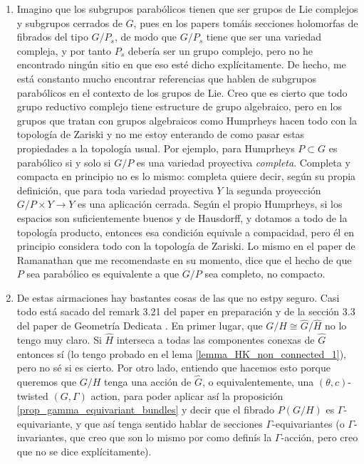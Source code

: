 {\begin{enumerate}
    \item[\textbf{(14)}] Imagino que los subgrupos parabólicos tienen que ser grupos de Lie complejos y subgrupos cerrados de \(G\), pues en los papers tomáis secciones holomorfas de fibrados del tipo \(G/P_s\), de modo que \(G/P_s\) tiene que ser una variedad compleja, y por tanto \(P_s\) debería ser un grupo complejo, pero no he encontrado ningún sitio en que eso esté dicho explícitamente. De hecho, me está constanto mucho encontrar referencias que hablen de subgrupos parabólicos en el contexto de los grupos de Lie. Creo que es cierto que todo grupo reductivo complejo tiene estructure de grupo algebraico, pero en los grupos que tratan con grupos algebraicos como Humprheys \parencite{humphreys1975linear} hacen todo con la topología de Zariski y no me estoy enterando de como pasar estas propiedades a la topología usual. Por ejemplo, para Humprheys \(P \subset G\) es parabólico si y solo si \(G/P\) es una variedad proyectiva \textit{completa}. Completa y compacta en principio no es lo mismo: completa quiere decir, según su propia definición, que para toda variedad proyectiva \(Y\) la segunda proyección \(G/P \times Y \to Y\) es una aplicación cerrada. Según el propio Humprheys, si los espacios son suficientemente buenos y de Hausdorff, y dotamos a todo de la topología producto, entonces esa condición equivale a compacidad, pero él en principio considera todo con la topología de Zariski. Lo mismo en el paper de Ramanathan \parencite{Ramanathan1996} que me recomendaste en su momento, dice que el hecho de que \(P\) sea parabólico es equivalente a que \(G/P\) sea completo, no compacto.
    \item[\textbf{(15)}] De estas airmaciones hay bastantes cosas de las que no estpy seguro. Casi todo está sacado del remark 3.21 del paper en preparación y de la sección 3.3 del paper de Geometría Dedicata \parencite{barajas2023non}. En primer lugar, que \(G/H\cong \hat{G}/\hat{H}\) no lo tengo muy claro. Si \(\hat{H}\) interseca a todas las componentes conexas de \(\hat{G}\) entonces sí (lo tengo probado en el lema \ref{lemma_HK_non_connected_1}), pero no sé si es cierto. Por otro lado, entiendo que hacemos esto porque queremos que \(G/H\) tenga una acción de \(\hat{G}\), o equivalentemente, una \((\theta,c)\)-twisted \((G, \Gamma)\) action, para poder aplicar así la proposición \ref{prop_gamma_equivariant_bundles} y decir que el fibrado \(P(G/H)\) es \(\Gamma\)-equivariante, y que así tenga sentido hablar de secciones \(\Gamma\)-equivariantes (o \(\Gamma\)-invariantes, que creo que son lo mismo por como definís la \(\Gamma\)-acción, pero creo que no se dice explícitamente).

\end{enumerate}}
